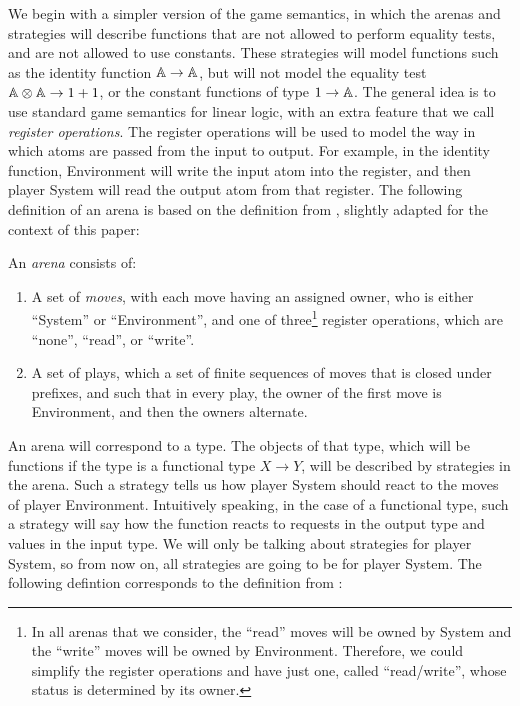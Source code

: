 We begin with a simpler version of the game semantics, in which the arenas and strategies will describe functions that are not allowed to perform equality tests, and are not allowed to use constants. These strategies will model functions such as the identity function $\mathbb A \to \mathbb A$, but will not model the equality test $\mathbb A \otimes \mathbb A \to 1 + 1$, or the constant functions of type $1 \to \mathbb A$. The general idea is to use standard game semantics for linear logic, with an extra feature that we call \emph{register operations}. The register operations will be used to model the way in which atoms are passed from the input to output. For example, in the identity function,  Environment will  write the input atom into the register, and then player System will read the output atom from that register. The following definition of an arena is based on the definition from \cite[p.4]{abramsky2013semantics}, slightly
adapted for the context of this paper:
\begin{definition}[Arena] 
    An \emph{arena} consists of:
    \begin{enumerate}
        \item A set of \emph{moves}, with each move having an assigned owner, who is either ``System'' or ``Environment'', and one of three\footnote{\label{footnote:read-write} In all arenas that we consider, the ``read'' moves will be owned by System and the ``write'' moves will be owned by Environment. Therefore, we could simplify the register operations and have just one, called ``read/write'', whose status is determined by its owner. 
        } register operations, which are ``none'', ``read'', or ``write''.
                \item A set of plays, which a set of finite sequences of moves that is closed under prefixes, and such that in every play, the owner of the first move is Environment, and then the owners alternate.
    \end{enumerate}
\end{definition}




An arena will correspond to a type. The objects of that type, which will be  functions if the type is a functional type $X \to Y$, will be described by strategies in the arena. Such a strategy tells us how player System should react to the moves of player Environment. Intuitively speaking, in the case of a functional type, such a strategy will say how the function reacts to requests in the output type and values in the input type. We will only be talking about strategies for player System, so from now on, all strategies are going to be for player System. The following defintion corresponds to the definition from \cite[p.5]{abramsky2013semantics}:


